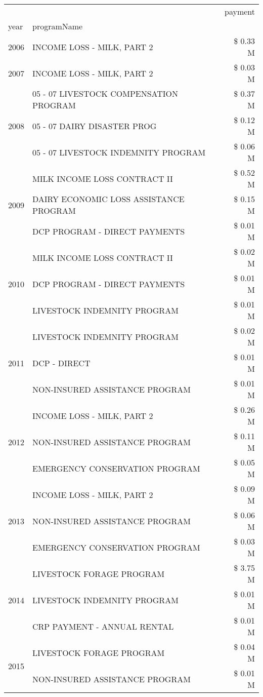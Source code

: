 \begin{tabular}{llr}
\toprule
 &  & payment \\
year & programName &  \\
\midrule
2006 & INCOME LOSS - MILK, PART 2 & \$ 0.33 M \\
\cline{1-3}
2007 & INCOME LOSS - MILK, PART 2 & \$ 0.03 M \\
\cline{1-3}
\multirow[t]{3}{*}{2008} & 05 - 07 LIVESTOCK COMPENSATION PROGRAM & \$ 0.37 M \\
 & 05 - 07 DAIRY DISASTER PROG & \$ 0.12 M \\
 & 05 - 07 LIVESTOCK INDEMNITY PROGRAM & \$ 0.06 M \\
\cline{1-3}
\multirow[t]{3}{*}{2009} & MILK INCOME LOSS CONTRACT II & \$ 0.52 M \\
 & DAIRY ECONOMIC LOSS ASSISTANCE PROGRAM & \$ 0.15 M \\
 & DCP PROGRAM - DIRECT PAYMENTS & \$ 0.01 M \\
\cline{1-3}
\multirow[t]{3}{*}{2010} & MILK INCOME LOSS CONTRACT II & \$ 0.02 M \\
 & DCP PROGRAM - DIRECT PAYMENTS & \$ 0.01 M \\
 & LIVESTOCK INDEMNITY PROGRAM & \$ 0.01 M \\
\cline{1-3}
\multirow[t]{3}{*}{2011} & LIVESTOCK INDEMNITY PROGRAM & \$ 0.02 M \\
 & DCP - DIRECT & \$ 0.01 M \\
 & NON-INSURED ASSISTANCE PROGRAM & \$ 0.01 M \\
\cline{1-3}
\multirow[t]{3}{*}{2012} & INCOME LOSS - MILK, PART 2 & \$ 0.26 M \\
 & NON-INSURED ASSISTANCE PROGRAM & \$ 0.11 M \\
 & EMERGENCY CONSERVATION PROGRAM & \$ 0.05 M \\
\cline{1-3}
\multirow[t]{3}{*}{2013} & INCOME LOSS - MILK, PART 2 & \$ 0.09 M \\
 & NON-INSURED ASSISTANCE PROGRAM & \$ 0.06 M \\
 & EMERGENCY CONSERVATION PROGRAM & \$ 0.03 M \\
\cline{1-3}
\multirow[t]{3}{*}{2014} & LIVESTOCK FORAGE PROGRAM & \$ 3.75 M \\
 & LIVESTOCK INDEMNITY PROGRAM & \$ 0.01 M \\
 & CRP PAYMENT - ANNUAL RENTAL & \$ 0.01 M \\
\cline{1-3}
\multirow[t]{3}{*}{2015} & LIVESTOCK FORAGE PROGRAM & \$ 0.04 M \\
 & NON-INSURED ASSISTANCE PROGRAM & \$ 0.01 M \\

\end{tabular}
